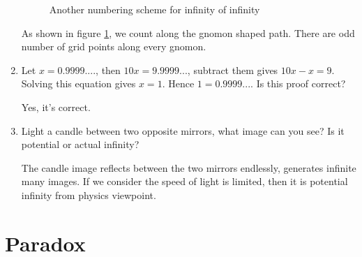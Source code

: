 \documentclass[UTF8]{article}
\begin{document}
\begin{enumerate}
\begin{figure}[htbp]
\centering
{}
\caption{Another numbering scheme for infinity of infinity}
\label{fig:NNtoN2}
\end{figure}

As shown in figure \ref{fig:NNtoN2}, we count along the gnomon shaped path. There are odd number of grid points along every gnomon.

\item{Let $x = 0.9999....$, then $10x = 9.9999...$, subtract them gives $10x - x = 9$. Solving this equation gives $x = 1$. Hence $1 = 0.9999...$. Is this proof correct?}

Yes, it's correct.

\item{Light a candle between two opposite mirrors, what image can you see? Is it potential or actual infinity?}

The candle image reflects between the two mirrors endlessly, generates infinite many images. If we consider the speed of light is limited, then it is potential infinity from physics viewpoint.

\end{enumerate}

\section{Paradox}
\end{document}
